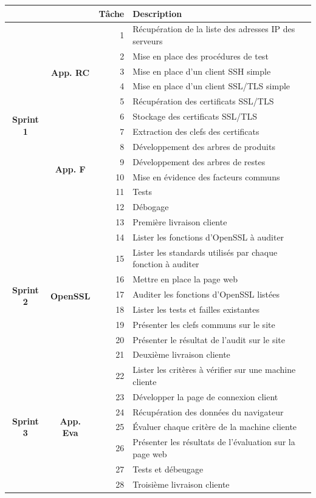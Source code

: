 \documentclass[a4paper,11pt,french]{article}
\begin{document}
\begin{tabular}{|c|c|r|l|}
\hline
&&\textbf{Tâche} & \textbf{Description}\\
\hline
\multirow{13}{*}{\begin{sideways}\textbf{Sprint 1}\end{sideways}}&\multirow{6}{*}{\textbf{App. RC}}
&  1 & Récupération de la liste des adresses IP des serveurs\\
&& 2 & Mise en place des procédures de test			\\
&& 3 & Mise en place d'un client SSH simple			\\
&& 4 & Mise en place d'un client SSL/TLS simple		\\
&& 5 & Récupération des certificats SSL/TLS 		\\
&& 6 & Stockage des certificats SSL/TLS				\\
\cline{2-4}
&\multirow{6}{*}{\textbf{App. F}}
&  7 &  Extraction des clefs des certificats		\\
&& 8 &  Développement des arbres de produits		\\
&& 9 &  Développement des arbres de restes			\\
&& 10 &  Mise en évidence des facteurs communs		\\
&& 11 &  Tests										\\
&& 12 &  Débogage									\\
&& 13 &  Première livraison cliente					\\
\cline{1-4}
\multirow{8}{*}{\begin{sideways}\textbf{Sprint 2}\end{sideways}}&\multirow{8}{*}{\textbf{OpenSSL}}
&  14 &  Lister les fonctions d'OpenSSL à auditer\\
&& 15 &  Lister les standards utilisés par chaque fonction à auditer\\
&& 16 &  Mettre en place la page web\\
&& 17 &	 Auditer les fonctions d'OpenSSL listées\\
&& 18 &  Lister les tests et failles existantes\\
&& 19 &  Présenter les clefs communs sur le site\\
&& 20 &  Présenter le résultat de l'audit sur le site\\
&& 21 &  Deuxième livraison cliente\\
\hline

\multirow{7}{*}{\begin{sideways}\textbf{Sprint 3}\end{sideways}}&\multirow{7}{*}{\textbf{App. Eva}}
&  22 & Lister les critères à vérifier sur une machine cliente\\
&& 23 & Développer la page de connexion client\\
&& 24 & Récupération des données du navigateur\\
&& 25 & Évaluer chaque critère de la machine cliente\\
&& 26 & Présenter les résultats de l'évaluation sur la page web\\
&& 27 & Tests et débeugage\\
&& 28 & Troisième livraison cliente\\\hline


\end{tabular}
\end{document}
